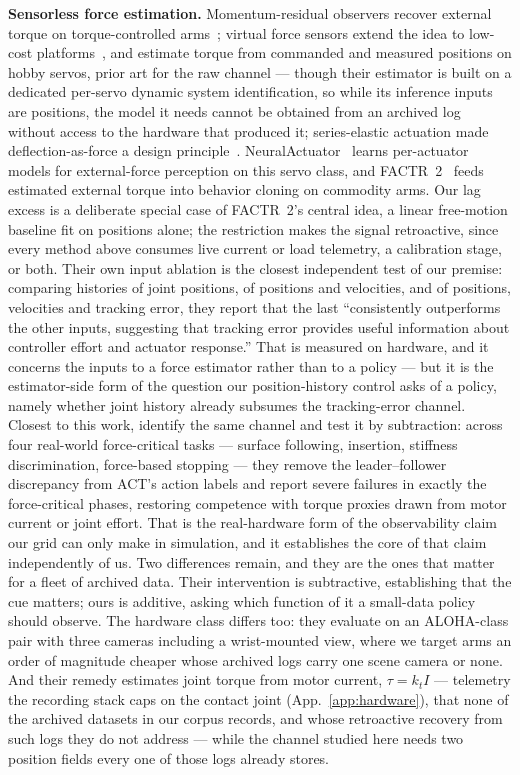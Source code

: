 \documentclass{article}
\begin{document}
\textbf{Sensorless force estimation.} Momentum-residual observers recover
external torque on torque-controlled arms~\citep{deluca2005sensorless,
haddadin2017collisions}; virtual force sensors extend the idea to
low-cost platforms~\citep{yen2019virtual}, and \citet{hwang2018virtual}
estimate torque from commanded and measured positions on hobby servos,
prior art for the raw channel --- though their estimator is built on a
dedicated per-servo dynamic system identification, so while its inference
inputs are positions, the model it needs cannot be obtained from an
archived log without access to the hardware that produced it; series-elastic actuation made
deflection-as-force a design principle~\citep{pratt1995sea,
williamson1995sea}.
NeuralActuator~\citep{dou2026neuralactuator} learns per-actuator models
for external-force perception on this servo class, and
FACTR~2~\citep{oh2026factr2, liu2025factr} feeds estimated external
torque into behavior cloning on commodity arms. Our lag excess is a
deliberate special case of FACTR~2's central idea, a linear free-motion
baseline fit on positions alone; the restriction makes the signal
retroactive, since every method above consumes live current or load
telemetry, a calibration stage, or both. Their own input ablation is the
closest independent test of our premise: comparing histories of joint
positions, of positions and velocities, and of positions, velocities and
tracking error, they report that the last ``consistently outperforms the
other inputs, suggesting that tracking error provides useful information
about controller effort and actuator response.'' That is measured on
hardware, and it concerns the inputs to a force estimator rather than to
a policy --- but it is the estimator-side form of the question our
position-history control asks of a policy, namely whether joint history
already subsumes the tracking-error channel. Closest to this work,
\citet{wong2026beyond} identify the same channel and test it by
subtraction: across four real-world force-critical tasks --- surface
following, insertion, stiffness discrimination, force-based stopping ---
they remove the leader--follower discrepancy from ACT's action labels and
report severe failures in exactly the force-critical phases, restoring
competence with torque proxies drawn from motor current or joint effort.
That is the real-hardware form of the observability claim our grid can
only make in simulation, and it establishes the core of that claim
independently of us. Two differences remain, and they are the ones that
matter for a fleet of archived data. Their intervention is subtractive,
establishing that the cue matters; ours is additive, asking which
function of it a small-data policy should observe. The hardware class
differs too: they evaluate on an ALOHA-class pair with three cameras
including a wrist-mounted view, where we target arms an order of
magnitude cheaper whose archived logs carry one scene camera or none.
And their remedy estimates joint torque from motor current, $\tau = k_t
I$ --- telemetry the recording stack caps on the contact joint
(App.~\ref{app:hardware}), that none of the archived datasets in our
corpus records, and whose retroactive recovery from such logs they do
not address --- while the channel studied here needs two position fields
every one of those logs already stores.
\end{document}
